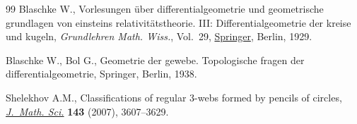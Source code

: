 \documentclass[11pt]{article}
\numberwithin{equation}{section}
\numberwithin{equation}{section}
\begin{document}
\begin{thebibliography}{99}
Blaschke W., Vorlesungen \"uber differentialgeometrie und geometrische
 grundlagen von einsteins relativit\"atstheorie. {III}: {D}ifferentialgeometrie
 der kreise und kugeln, \textit{Grundlehren Math. Wiss.}, Vol.~29,
 \href{https://doi.org/10.1007/978-3-642-50823-3}{Springer}, Berlin, 1929.

Blaschke W., Bol G., Geometrie der gewebe. {T}opologische fragen der
 differentialgeometrie, Springer, Berlin, 1938.

Shelekhov A.M., Classifications of regular 3-webs formed by pencils of circles,
 \href{https://doi.org/10.1007/s10958-007-0225-z}{\textit{J.~Math. Sci.}}
 \textbf{143} (2007), 3607--3629.

\end{thebibliography}
\end{document}
